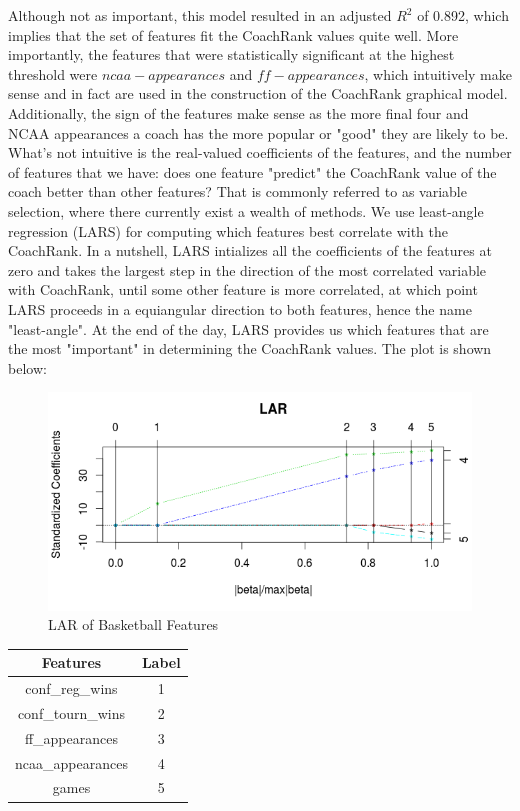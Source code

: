 \documentclass[11pt,notitlepage]{article}
\begin{document}
\vspace{2 mm}

\noindent Although not as important, this model resulted in an adjusted $R^2$ of 0.892, which implies that the set of features fit the CoachRank values quite well. More importantly, the features that were statistically significant at the highest threshold were $ncaa-appearances$ and $ff-appearances$, which intuitively make sense and in fact are used in the construction of the CoachRank graphical model. Additionally, the sign of the features make sense as the more final four and NCAA appearances a coach has the more popular or "good" they are likely to be. What's not intuitive is the real-valued coefficients of the features, and the number of features that we have: does one feature "predict" the CoachRank value of the coach better than other features? That is commonly referred to as variable selection, where there currently exist a wealth of methods. We use least-angle regression (LARS) for computing which features best correlate with the CoachRank. In a nutshell, LARS intializes all the coefficients of the features at zero and takes the largest step in the direction of the most correlated variable with CoachRank, until some other feature is more correlated, at which point LARS proceeds in a equiangular direction to both features, hence the name "least-angle". At the end of the day, LARS provides us which features that are the most "important" in determining the CoachRank values. The plot is shown below:

\begin{figure}[H]
      \caption{LAR of Basketball Features}
      \centering
      \includegraphics[width=1.0\textwidth]{fixedplot.png}
\end{figure}

\begin{center}
\begin{tabular}{ | c | c |}
\hline
Features            & Label \\\hline
conf\_reg\_wins      & 1      \\\hline
conf\_tourn\_wins     & 2     \\\hline
ff\_appearances      &  3    \\\hline
ncaa\_appearances    & 4      \\\hline
games               & 5      \\
\hline
\end{tabular}
\end{center}
\end{document}
